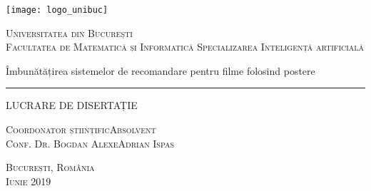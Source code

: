 \begin{titlepage}
	\begin{center}

		\texttt{[image: logo\_unibuc]}

		\vspace{0.5cm}
		\LARGE \textsc{Universitatea din București}
		\\
		\vspace{0.5cm}
		\Large \textsc{Facultatea de Matematică și Informatică}
		\vspace{0.5cm}
		\Large \textsc{Specializarea Inteligență artificială}

		\vfill

		\Huge Îmbunătățirea sistemelor de recomandare pentru filme folosind postere
		\rule{\textwidth}{1pt}
		\Large LUCRARE DE DISERTAȚIE

		\vfill

		\Large
		\textsc{Coordonator științific}\hfill \textsc{Absolvent}
		\\
		\large
		\textsc{Conf. Dr. Bogdan Alexe}\hfill \textsc{Adrian Ispas}
	
		\vspace{1.5cm}
		\textsc{București, România}\\
		\textsc{Iunie 2019}

	\end{center}
\end{titlepage}
